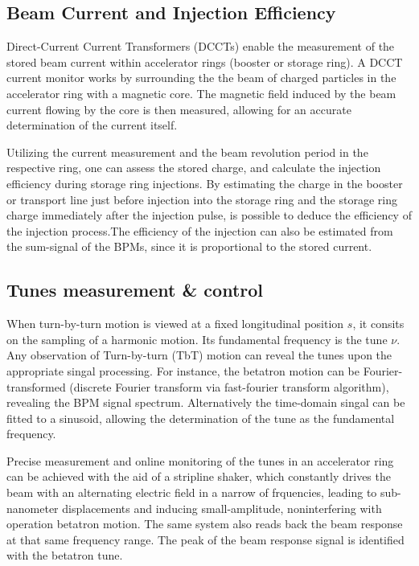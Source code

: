\subsection{Beam Current and Injection Efficiency}
Direct-Current Current Transformers (DCCTs) enable the measurement of the stored beam current within accelerator rings (booster or storage ring). A DCCT current monitor works by surrounding the the beam of charged particles in the accelerator ring with a magnetic core. The magnetic field induced by the beam current flowing by the core is then measured, allowing for an accurate determination of the current itself.

 Utilizing the current measurement and the beam revolution period in the respective ring, one can assess the stored charge, and calculate the injection efficiency during storage ring injections. By estimating the charge in the booster or transport line just before injection into the storage ring and the storage ring charge immediately after the injection pulse, is possible to deduce the efficiency of the injection process.The efficiency of the injection can also be estimated from the sum-signal of the BPMs, since it is proportional to the stored current.

\subsection{Tunes measurement \& control}
When turn-by-turn motion is viewed at a fixed longitudinal position $s$, it consits on the sampling of a harmonic motion. Its fundamental frequency is the tune $\nu$. Any observation of Turn-by-turn (TbT) motion can reveal the tunes upon the appropriate singal processing. For instance, the betatron motion can be Fourier-transformed (discrete Fourier transform via fast-fourier transform algorithm), revealing the BPM signal spectrum. Alternatively the time-domain singal can be fitted to a sinusoid, allowing the determination of the tune as the fundamental frequency.

Precise measurement and online monitoring of the tunes in an accelerator ring can be achieved with the aid of a stripline shaker, which constantly drives the beam with an alternating electric field in a narrow of frquencies, leading to sub-nanometer displacements and inducing small-amplitude, noninterfering with operation betatron motion. The same system also reads back the beam response at that same frequency range. The peak of the beam response signal is identified with the betatron tune.

